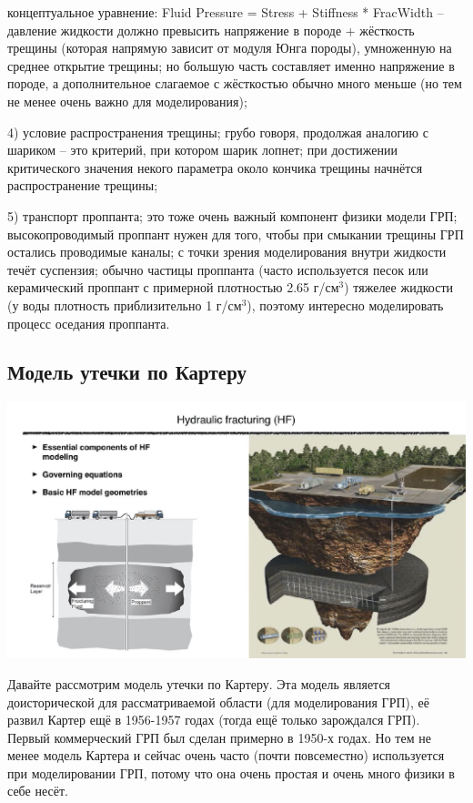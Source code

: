 \documentclass[main.tex]{subfiles}
\begin{document}
концептуальное уравнение: Fluid Pressure = Stress + Stiffness * FracWidth -- давление жидкости должно превысить напряжение в породе + жёсткость трещины (которая напрямую зависит от модуля Юнга породы), умноженную на среднее открытие трещины;
но большую часть составляет именно напряжение в породе, а дополнительное слагаемое с жёсткостью обычно много меньше (но тем не менее очень важно для моделирования); 

4) условие распространения трещины; грубо говоря, продолжая аналогию с шариком -- это критерий, при котором шарик лопнет; при достижении критического значения некого параметра около кончика трещины начнётся распространение трещины;

5) транспорт проппанта; это тоже очень важный компонент физики модели ГРП; высокопроводимый проппант нужен для того, чтобы при смыкании трещины ГРП остались проводимые каналы;
с точки зрения моделирования внутри жидкости течёт суспензия; обычно частицы проппанта (часто используется песок или керамический проппант с примерной плотностью 2.65 г/см$^3$) тяжелее жидкости (у воды плотность приблизительно 1 г/см$^3$), поэтому интересно моделировать процесс оседания проппанта.

\subsection{Модель утечки по Картеру}

\includegraphics[width=\textwidth, page=3]{HF_slides.pdf}

Давайте рассмотрим модель утечки по Картеру.
Эта модель является доисторической для рассматриваемой области (для моделирования ГРП), её развил Картер ещё в 1956-1957 годах (тогда ещё только зарождался ГРП).
Первый коммерческий ГРП был сделан примерно в 1950-х годах.
Но тем не менее модель Картера и сейчас очень часто (почти повсеместно) используется при моделировании ГРП, потому что она очень простая и очень много физики в себе несёт.
\end{document}
